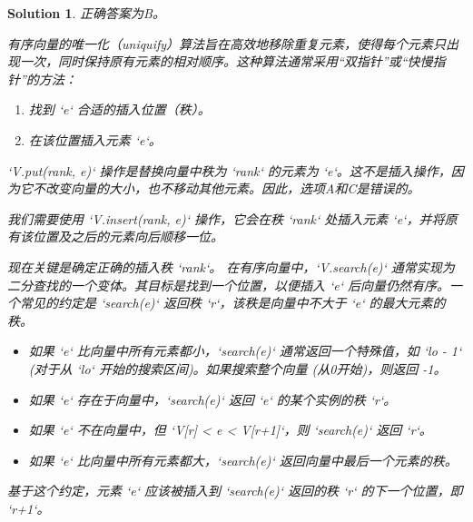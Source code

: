 \documentclass[UTF8]{report}
\newtheorem{solution}{Solution}
\theoremstyle{MyLineTheoremStyle} %
\theoremstyle{MyBlockTheoremStyle} %
\theoremstyle{MySubsubsectionStyle} %
\begin{document}
\begin{solution}
正确答案为B。

有序向量的唯一化（uniquify）算法旨在高效地移除重复元素，使得每个元素只出现一次，同时保持原有元素的相对顺序。这种算法通常采用“双指针”或“快慢指针”的方法：
\begin{enumerate}
    \item 找到 `e` 合适的插入位置（秩）。
    \item 在该位置插入元素 `e`。
\end{enumerate}

`V.put(rank, e)` 操作是替换向量中秩为 `rank` 的元素为 `e`。这不是插入操作，因为它不改变向量的大小，也不移动其他元素。因此，选项A和C是错误的。

我们需要使用 `V.insert(rank, e)` 操作，它会在秩 `rank` 处插入元素 `e`，并将原有该位置及之后的元素向后顺移一位。

现在关键是确定正确的插入秩 `rank`。
在有序向量中，`V.search(e)` 通常实现为二分查找的一个变体。其目标是找到一个位置，以便插入 `e` 后向量仍然有序。一个常见的约定是 `search(e)` 返回秩 `r`，该秩是向量中不大于 `e` 的最大元素的秩。
\begin{itemize}
    \item 如果 `e` 比向量中所有元素都小，`search(e)` 通常返回一个特殊值，如 `lo - 1` (对于从 `lo` 开始的搜索区间)。如果搜索整个向量 (从0开始)，则返回 -1。
    \item 如果 `e` 存在于向量中，`search(e)` 返回 `e` 的某个实例的秩 `r`。
    \item 如果 `e` 不在向量中，但 `V[r] < e < V[r+1]`，则 `search(e)` 返回 `r`。
    \item 如果 `e` 比向量中所有元素都大，`search(e)` 返回向量中最后一个元素的秩。
\end{itemize}
基于这个约定，元素 `e` 应该被插入到 `search(e)` 返回的秩 `r` 的下一个位置，即 `r+1`。


\end{solution}
\end{document}

